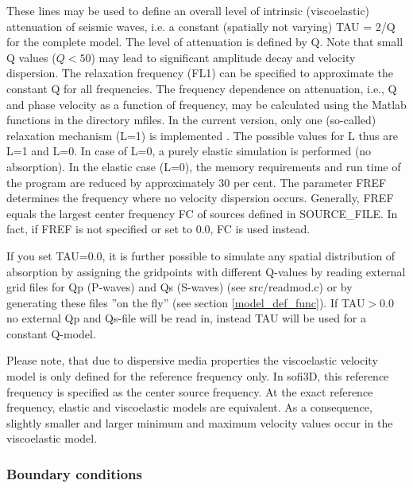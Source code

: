 \documentclass[11pt,onecolumn,oneside]{article}
\begin{document}
These lines may be used to define an overall level of intrinsic (viscoelastic) attenuation of seismic waves, i.e. a constant (spatially not varying) TAU = 2/Q for the complete model. The level of attenuation is defined by Q. Note that small Q values ($Q<50$) may lead to significant amplitude decay and velocity dispersion. The relaxation frequency (FL1) can be specified to approximate the constant Q for all frequencies. The frequency dependence on attenuation, i.e., Q and phase velocity as a function  of frequency, may be calculated using the Matlab functions in the directory mfiles.
In the current version, only one (so-called) relaxation mechanism (L=1) is implemented \cite{bohlen:98,blanch:95,bohlen:02}. The possible values for L thus are L=1 and L=0. In case of L=0, a purely elastic simulation is performed (no absorption). In the elastic case (L=0), the memory requirements and run time of the program are reduced by approximately 30 per cent. The parameter FREF determines the frequency where no velocity dispersion occurs. Generally, FREF equals the largest center frequency FC of sources defined in SOURCE\_FILE. In fact, if FREF is not specified or set to 0.0, FC is used instead.

If you set TAU=0.0, it is further possible to simulate any spatial distribution of absorption by assigning the gridpoints with different Q-values by reading external grid files for Qp (P-waves) and Qs (S-waves) (see src/readmod.c) or by generating these files ''on the fly'' (see section \ref{model_def_func}). If TAU$>$0.0 no external Qp and Qs-file will be read in, instead TAU will be used for a constant Q-model.

Please note, that due to dispersive media properties the viscoelastic velocity model is only defined for the reference frequency only. In sofi3D, this reference frequency is specified as the center source frequency. At the exact reference frequency, elastic and viscoelastic models are equivalent. As a consequence, slightly smaller and larger minimum and maximum velocity values occur in the viscoelastic model.


\subsubsection{Boundary conditions}
\label{abs}
\end{document}
